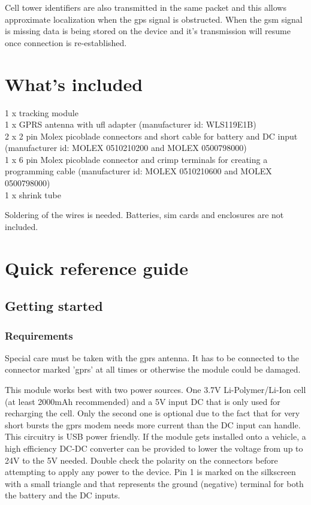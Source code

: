 \documentclass[a4paper,twoside]{refart}
\begin{document}
Cell tower identifiers are also transmitted in the same packet and this allows approximate localization when the gps signal is obstructed. When the gsm signal is missing data is being stored on the device and it's transmission will resume once connection is re-established.

\section{What's included}

1 x tracking module \\
1 x GPRS antenna with ufl adapter (manufacturer id: WLS119E1B) \\
2 x 2 pin Molex picoblade connectors and short cable for battery and DC input (manufacturer id: MOLEX 0510210200 and MOLEX 0500798000) \\
1 x 6 pin Molex picoblade connector and crimp terminals for creating a programming cable (manufacturer id: MOLEX 0510210600 and MOLEX 0500798000) \\
1 x shrink tube

Soldering of the wires is needed. Batteries, sim cards and enclosures are not included.

\section{Quick reference guide}

\subsection{Getting started}

\subsubsection{Requirements}

 Special care must be taken with the gprs antenna. It has to be connected to the connector marked 'gprs' at all times or otherwise the module could be damaged.

This module works best with two power sources. One 3.7V Li-Polymer/Li-Ion cell (at least 2000mAh recommended) and a 5V input DC that is only used for recharging the cell. Only the second one is optional due to the fact that for very short bursts the gprs modem needs more current than the DC input can handle. This circuitry is USB power friendly. If the module gets installed onto a vehicle, a high efficiency DC-DC converter can be provided to lower the voltage from up to 24V to the 5V needed. Double check the polarity on the connectors before attempting to apply any power to the device. Pin 1 is marked on the silkscreen with a small triangle and that represents the ground (negative) terminal for both the battery and the DC inputs.
\end{document}
